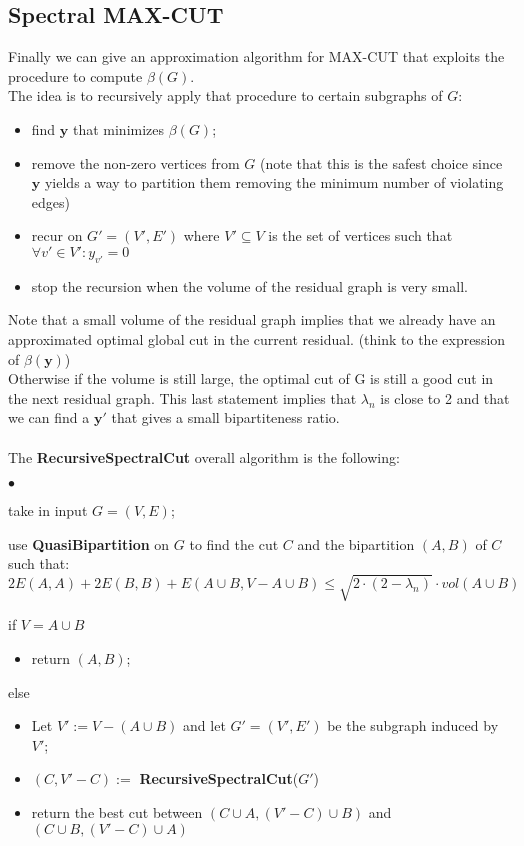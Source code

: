 \subsection{Spectral MAX-CUT}
Finally we can give an approximation algorithm for MAX-CUT that exploits the procedure to compute $ \beta(G) $.\\
The idea is to recursively apply that procedure to certain subgraphs of $ G $:
\begin{itemize}
\item find $ \mathbf{y} $ that minimizes $ \beta(G) $;
\item remove the non-zero vertices from $ G $ (note that this is the safest choice since $ \mathbf{y} $ yields a way to partition them removing the minimum number of violating edges)
\item recur on $ G'=(V',E') $ where $ V' \subseteq V $ is the set of vertices such that $ \forall  v' \in V' : y_{v'} = 0 $
\item stop the recursion when the volume of the residual graph is very small.
\end{itemize}
Note that a small volume of the residual graph implies that we already have an approximated optimal global cut in the current residual. (think to the expression of $ \beta(\mathbf{y}) $)
\\
Otherwise if the volume is still large, the optimal cut of G is still a good cut in the next residual graph. This last statement implies that $ \lambda_n $ is close to 2 and that we can find a $ \mathbf{y'} $ that gives a small bipartiteness ratio.
\\ 
\\
The \textbf{RecursiveSpectralCut} overall algorithm is the following:
\begin{list}{$\bullet$}{}
	\item take in input $ G = (V,E) $;
	\item use \textbf{QuasiBipartition} on $ G $ to find the cut $ C $ and the bipartition $ (A,B) $ of $ C $ such that:
	\[ 2E(A,A) + 2E(B,B) + E(A \cup B, V - A \cup B) \leq \sqrt{2 \cdot (2-\lambda_n)} \cdot vol(A \cup B)  \]
	\item if $ V = A \cup B $
	\begin{itemize}
		\item return $ (A,B) $;
	\end{itemize}
	\item else
	\begin{itemize}
		\item Let $ V' := V - (A \cup B) $ and let $ G' =(V',E')$ be the subgraph induced by $V'$;
		\item $ (C, V'-C) := $ \textbf{RecursiveSpectralCut}($ G' $)
		\item return the best cut between 
$ (C \cup A, (V'- C) \cup B) $ and $ (C \cup B, (V'- C) \cup A) $
\end{itemize}
\end{list}

